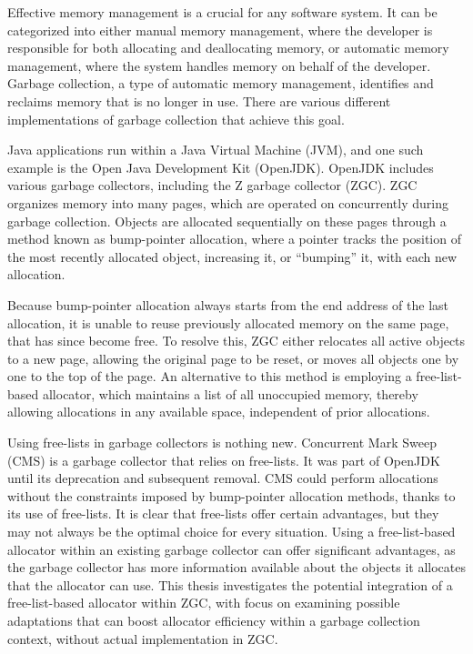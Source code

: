 Effective memory management is a crucial for any software system. It can be categorized into either manual memory management, where the developer is responsible for both allocating and deallocating memory, or automatic memory management, where the system handles memory on behalf of the developer. Garbage collection, a type of automatic memory management, identifies and reclaims memory that is no longer in use. There are various different implementations of garbage collection that achieve this goal.

Java applications run within a Java Virtual Machine (JVM), and one such example is the Open Java Development Kit (OpenJDK). OpenJDK includes various garbage collectors, including the Z garbage collector (ZGC). ZGC organizes memory into many pages, which are operated on concurrently during garbage collection. Objects are allocated sequentially on these pages through a method known as bump-pointer allocation, where a pointer tracks the position of the most recently allocated object, increasing it, or ``bumping'' it, with each new allocation.

Because bump-pointer allocation always starts from the end address of the last allocation, it is unable to reuse previously allocated memory on the same page, that has since become free. To resolve this, ZGC either relocates all active objects to a new page, allowing the original page to be reset, or moves all objects one by one to the top of the page. An alternative to this method is employing a free-list-based allocator, which maintains a list of all unoccupied memory, thereby allowing allocations in any available space, independent of prior allocations.

Using free-lists in garbage collectors is nothing new. Concurrent Mark Sweep (CMS) is a garbage collector that relies on free-lists. It was part of OpenJDK until its deprecation and subsequent removal. CMS could perform allocations without the constraints imposed by bump-pointer allocation methods, thanks to its use of free-lists. It is clear that free-lists offer certain advantages, but they may not always be the optimal choice for every situation. Using a free-list-based allocator within an existing garbage collector can offer significant advantages, as the garbage collector has more information available about the objects it allocates that the allocator can use. This thesis investigates the potential integration of a free-list-based allocator within ZGC, with focus on examining possible adaptations that can boost allocator efficiency within a garbage collection context, without actual implementation in ZGC. 

